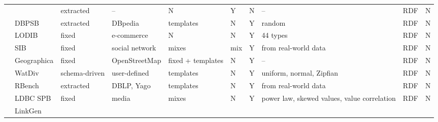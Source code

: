 \begin{sidewaystable}
{\begin{tabular}{| c | p{2.2cm} | p{2cm} |  p{2.2cm} | l |  l | l | p{3cm} | p{1.4cm} | l | }
\cline{2-10}
 & \cite{Duan:2011:AOC:1989323.1989340} & extracted & -- & N & Y &N & -- &  RDF & N    \\
\cline{2-10}
 & DBPSB & extracted & DBpedia &  templates & N & Y & random &  RDF & N   \\
\cline{2-10}
 & LODIB & fixed & e-commerce &  N & N & Y & 44 types &  RDF & N   \\
\cline{2-10}
 & SIB & fixed & social network &  mixes & mix & Y & from real-world data &  RDF & N   \\
\cline{2-10}
 & Geographica & fixed & OpenStreetMap  & fixed + templates  & N & Y & -- &  RDF & N   \\
\cline{2-10}
 & WatDiv & schema-driven & user-defined  & templates & N & Y & uniform, normal, Zipfian &  RDF & N   \\
\cline{2-10}
 & RBench & extracted & DBLP, Yago  & templates & N & Y & from real-world data &  RDF & N  \\
\cline{2-10}
 & LDBC SPB & fixed & media  & mixes & N & Y & power law, skewed values, value correlation &  RDF & N  \\
\cline{2-10}
 & LinkGen & & & & & & & & \\
\hline
\end{tabular} }
\label{tab:comparisonCharacteristicsA}
\end{sidewaystable}

